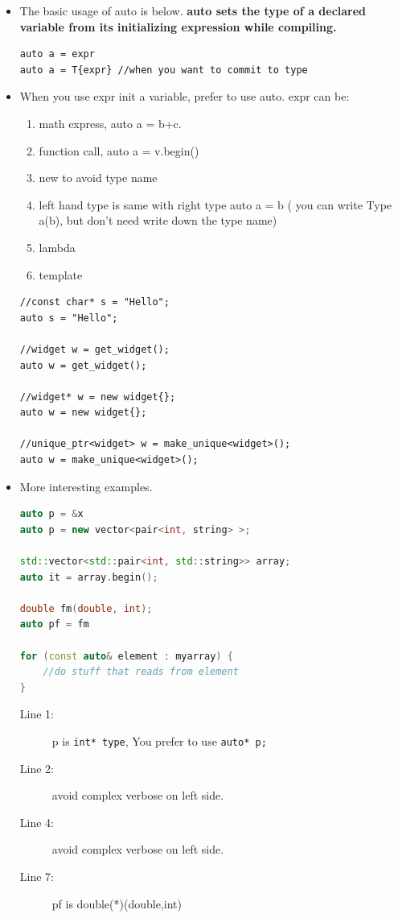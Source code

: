 \documentclass[a4paper,11pt,twoside]{book}
\begin{document}
\begin{itemize}
	\item The basic usage of auto is below. \textbf{auto sets the type of a declared variable from its initializing expression while compiling.}
\begin{lstlisting}[numbers=none]
auto a = expr
auto a = T{expr} //when you want to commit to type
\end{lstlisting}


	\item When you use expr init a variable, prefer to use auto. expr can be:
\begin{enumerate}
	\item math express, auto a = b+c.
	\item function call, auto a = v.begin()
	\item new to avoid type name
	\item left hand type is same with right type auto a = b ( you can write Type a(b), but don't need write down the type name)
	\item lambda
	\item template 
\end{enumerate}
\begin{lstlisting}[numbers=none]
//const char* s = "Hello";             
auto s = "Hello";

//widget w = get_widget();             
auto w = get_widget();

//widget* w = new widget{};    
auto w = new widget{}; 

//unique_ptr<widget> w = make_unique<widget>();
auto w = make_unique<widget>();
\end{lstlisting}

	\item More interesting examples.
	
\begin{lstlisting}[frame=single, language=c++]
auto p = &x  
auto p = new vector<pair<int, string> >;

std::vector<std::pair<int, std::string>> array;
auto it = array.begin();    
     
double fm(double, int);
auto pf = fm          

for (const auto& element : myarray) {
	//do stuff that reads from element
}
\end{lstlisting}
\begin{description}
	\item[Line 1:] p is \texttt{int* type}, You prefer to use \texttt{auto* p;}
	\item[Line 2:] avoid complex verbose on left side.
	\item[Line 4:] avoid complex verbose on left side.
	\item[Line 7:] pf is double(*)(double,int)
\end{description}
	

\end{itemize}
\end{document}
